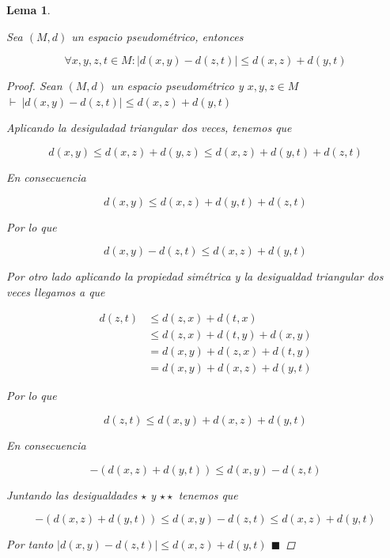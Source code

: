 \documentclass[oneside]{book} %
\theoremstyle{Teorema}
\newtheorem{Lema}[Definicion]{Lema}
\theoremstyle{Ejemplos}
\theoremstyle{[Obs]}
\newcommand{\abs}[1]{\left|#1\right|} %
\renewcommand{\{}{\left\lbrace} %
\renewcommand{\}}{\right\rbrace} %
\renewcommand{\qed}{$\blacksquare$} %
\newcommand{\pd}{$\vdash\ $} %
\begin{document}
			\begin{Lema}\label{Lema: Primer lema de metricas}\setlength{\parindent}{0em}
				
				Sea $(M, d)$ un espacio pseudométrico, entonces 

				\[ \forall x, y, z, t \in M : \abs{d(x, y) - d(z, t)} \leq d(x, z) + d(y, t) \] 

				\begin{proof}
					
					Sean $(M, d)$ un espacio pseudométrico y $x, y, z \in M$ \\
					\pd $\abs{d(x, y) - d(z, t)} \leq d(x, z) + d(y, t)$

					Aplicando la desiguladad triangular dos veces, tenemos que 
					
					\[ d(x, y) \leq d(x, z) + d(y, z) \leq d(x, z) + d(y, t) + d(z, t) \] 
					
					En consecuencia
					
					\[ d(x, y) \leq d(x, z) + d(y, t) + d(z, t) \] 
					
					Por lo que
					
					\begin{equation*}\tag{$\star$}
						d(x, y) - d(z, t) \leq d(x, z) + d(y, t)
					\end{equation*}

					Por otro lado aplicando la propiedad simétrica y la desigualdad triangular dos veces llegamos a que
					
					\begin{align*}
						d(z, t) & \leq d(z, x) + d(t, x) \\
						& \leq d(z, x) + d(t, y) + d(x, y) \\
						& = d(x, y) + d(z, x) + d(t, y) \\  
						& = d(x, y) + d(x, z) + d(y, t)
					\end{align*}
					
					Por lo que 
					
					\[ d(z, t) \leq d(x, y) + d(x, z) + d(y, t) \]
					
					En consecuencia 

					\begin{equation*}\tag{$\star\star$}
						- (d(x, z) + d(y, t)) \leq d(x, y) - d(z, t)
					\end{equation*}

					Juntando las desigualdades $\star$ y $\star\star$ tenemos que 

					\begin{equation*}
						- (d(x, z) + d(y, t)) \leq d(x, y) - d(z, t) \leq d(x, z) + d(y, t)
					\end{equation*}

					Por tanto $\abs{d(x, y) - d(z, t)} \leq d(x, z) + d(y, t)$ \qed

				\end{proof}

			\end{Lema}
\end{document}
